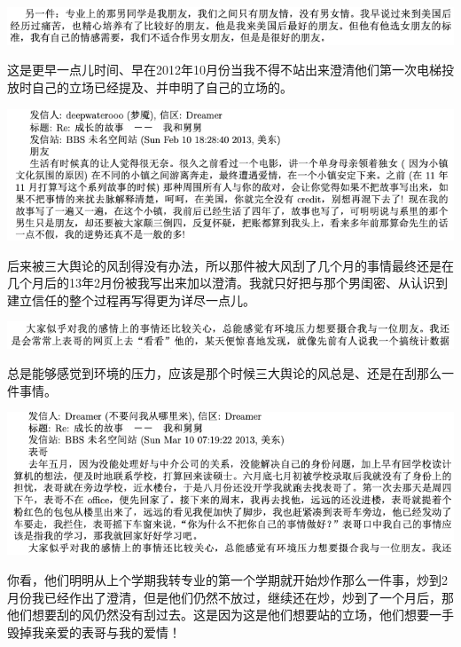 \documentclass[9pt, b5paper]{article}
\begin{document}
\begin{center}
\includegraphics[width=.9\linewidth]{./pic/backups_plans_20210424_102654.png}
\end{center}

这是更早一点儿时间、早在2012年10月份当我不得不站出来澄清他们第一次电梯投放时自己的立场已经提及、并申明了自己的立场的。

\begin{center}
\includegraphics[width=.9\linewidth]{./pic/backups_plans_20210424_102814.png}
\end{center}

后来被三大舆论的风刮得没有办法，所以那件被大风刮了几个月的事情最终还是在几个月后的13年2月份被我写出来加以澄清。我就只好把与那个男闺密、从认识到建立信任的整个过程再写得更为详尽一点儿。

\begin{center}
\includegraphics[width=.9\linewidth]{./pic/backups_plans_20210424_113449.png}
\end{center}

总是能够感觉到环境的压力，应该是那个时候三大舆论的风总是、还是在刮那么一件事情。

\begin{center}
\includegraphics[width=.9\linewidth]{./pic/backups_plans_20210501_093920.png}
\end{center}

你看，他们明明从上个学期我转专业的第一个学期就开始炒作那么一件事，炒到2月份我已经作出了澄清，但是他们仍然不放过，继续还在炒，炒到了一个月后，那他们想要刮的风仍然没有刮过去。这是因为这是他们想要站的立场，他们想要一手毁掉我亲爱的表哥与我的爱情！
\end{document}
